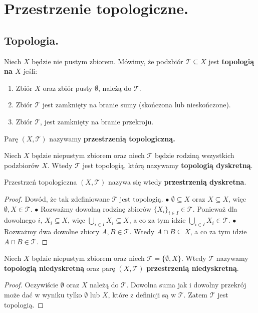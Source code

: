 \chapter{Przestrzenie topologiczne.}

\section{Topologia.}

\begin{definition}
	Niech $X$ będzie nie pustym zbiorem. Mówimy, że podzbiór $\mathcal{T}\subseteq X $ jest \textbf{topologią na $X$} jeśli:
    \begin{enumerate}[label=\arabic*)]
        \item Zbiór $X$ oraz zbiór pusty $\emptyset$, należą do $\mathcal{T}$.
        \item Zbiór $\mathcal{T}$ jest zamknięty na branie sumy (skończona lub nieskończone).
        \item Zbiór $\mathcal{T}$, jest zamknięty na branie przekroju.    
       \end{enumerate}

  Parę $\left( X, \mathcal{T} \right)  $ nazywamy \textbf{przestrzenią topologiczną.}   
\end{definition} 

\begin{definition}
    Niech $X$ będzie niepustym zbiorem oraz niech $\mathcal{T}$ będzie rodziną wszystkich podzbiorów $X$. Wtedy $\mathcal{T}$ jest topologią, którą nazywamy \textbf{topologią dyskretną}. 

Przestrzeń topologiczna $\left( X, \mathcal{T} \right)$ nazywa się wtedy \textbf{przestrzenią dyskretna}.         
\end{definition} 
\begin{proof}
    Dowód, że tak zdefiniowane $\mathcal{T}$ jest topologią. 
\noindent$\bullet$ $\emptyset \subseteq X $ oraz $X \subseteq X $, więc $\emptyset, X \in \mathcal{T}$.
\noindent$\bullet$ Rozważmy dowolną rodzinę zbiorów $\{X_{i} \}_{i \in I} \in \mathcal{T}$. Ponieważ dla dowolnego $i$, $X_{i} \subseteq X$, więc $\bigcup_{i \in I} X_{i}  \subseteq X $, a co za tym idzie $\bigcup_{i \in I} X_{i} \in \mathcal{T}$.
\noindent$\bullet$ Rozważmy dwa dowolne zbiory $A, B \in \mathcal{T}$. Wtedy $A\cap B \subseteq X $, a co za tym idzie $A\cap B \in \mathcal{T}.$  
\end{proof}

\begin{definition}
    Niech $X$ będzie niepustym zbiorem oraz niech $\mathcal{T} = \{\emptyset, X\}$. Wtedy $\mathcal{T}$ nazywamy \textbf{topologią niedyskretną} oraz parę $\left( X, \mathcal{T} \right)  $ \textbf{przestrzenią niedyskretną}.      
\end{definition}  
\begin{proof}
    Oczywiście $\emptyset$ oraz $X$ należą do $\mathcal{T}$. Dowolna suma jak i dowolny przekrój może dać w wyniku tylko $\emptyset$ lub $X$, które z definicji są w $\mathcal{T}$. Zatem $\mathcal{T}$ jest topologią.        
\end{proof} 

